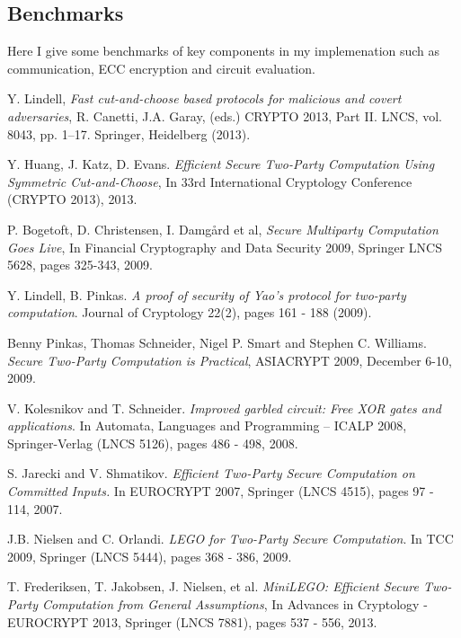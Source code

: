 \documentclass[a4paper,11pt]{article}
\begin{document}
		\subsection{Benchmarks}
			Here I give some benchmarks of key components in my implemenation such as communication, ECC encryption and circuit evaluation. 
		

	\begin{thebibliography}{5}
			Y. Lindell,
			\emph{Fast cut-and-choose based protocols for malicious and covert adversaries}, R. Canetti, J.A. Garay, (eds.) CRYPTO 2013, Part II. LNCS, vol. 8043, pp. 1–17. Springer, Heidelberg (2013).

			Y. Huang, J. Katz, D. Evans. \emph{Efficient Secure Two-Party Computation Using Symmetric Cut-and-Choose}, In 33rd International Cryptology Conference (CRYPTO 2013), 2013.

			P. Bogetoft, D. Christensen, I. Damgård et al, \emph{Secure Multiparty Computation Goes Live}, In Financial Cryptography and Data Security 2009, Springer LNCS 5628, pages 325-343, 2009.

			Y. Lindell, B. Pinkas. \emph{A proof of security of Yao’s protocol for two-party computation}. Journal of Cryptology 22(2), pages 161 - 188 (2009).
    
			Benny Pinkas, Thomas Schneider, Nigel P. Smart and Stephen C. Williams. \emph{Secure Two-Party Computation is Practical}, ASIACRYPT 2009, December 6-10, 2009.

			V. Kolesnikov and T. Schneider. \emph{Improved garbled circuit: Free XOR gates and applications}. In Automata, Languages and Programming – ICALP 2008, Springer-Verlag (LNCS 5126), pages 486 - 498, 2008.

			S. Jarecki and V. Shmatikov. \emph{Efficient Two-Party Secure Computation on Committed Inputs.} In EUROCRYPT 2007, Springer (LNCS 4515), pages 97 - 114, 2007.

			J.B. Nielsen and C. Orlandi. \emph{LEGO for Two-Party Secure Computation}. In TCC 2009, Springer (LNCS 5444), pages 368 - 386, 2009.

			T. Frederiksen, T. Jakobsen, J. Nielsen, et al. \emph{MiniLEGO: Efficient Secure Two-Party Computation from General Assumptions}, In Advances in Cryptology - EUROCRYPT 2013, Springer (LNCS 7881), pages 537 - 556, 2013.


\end{thebibliography}
\end{document}
